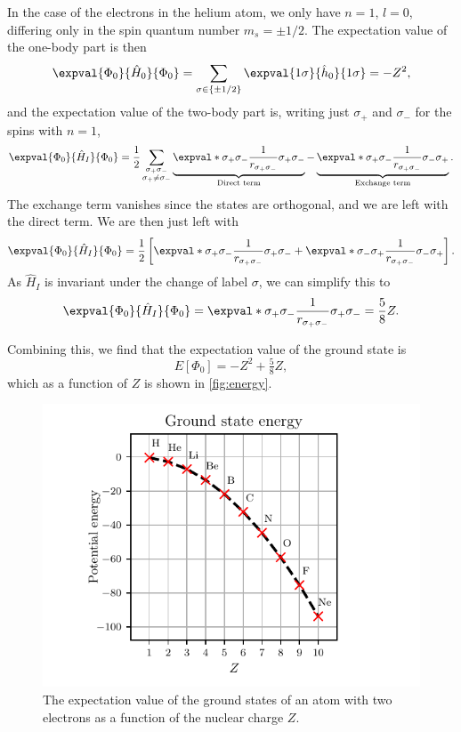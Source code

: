 In the case of the electrons in the helium atom, we only have $n = 1$, $l = 0$, differing only in the spin quantum number $m_s = \pm 1/2$.
The expectation value of the one-body part is then
\begin{equation*}
    \expval{\Phi_0}{\hat{H}_0}{\Phi_0} = \sum_{\sigma \in \{\pm 1/2\}} \expval{1\sigma}{\hat{h}_0}{1\sigma} = -Z^2,
\end{equation*}
and the expectation value of the two-body part is, writing just $\sigma_{+}$ and $\sigma_{-}$ for the spins with $n = 1$,
\begin{equation*}
    \expval{\Phi_0}{\hat{H}_I}{\Phi_0}
    = \frac{1}{2} \sum_{\substack{\sigma_{+}\sigma_{-}\\ \sigma_{+} \neq \sigma_{-}}}
    \underbrace{\expval*{\sigma_{+} \sigma_{-}}{\frac{1}{r_{\sigma_{+}\sigma_{-}}}}{\sigma_{+} \sigma_{-}}}_{\textnormal{Direct term}}
    - \underbrace{\expval*{\sigma_{+} \sigma_{-}}{\frac{1}{r_{\sigma_{+}\sigma_{-}}}}{\sigma_{-}\sigma_{+}}}_{\textnormal{Exchange term}}.
\end{equation*}
The exchange term vanishes since the states are orthogonal, and we are left with the direct term.
We are then just left with
\begin{equation*}
    \expval{\Phi_0}{\hat{H}_I}{\Phi_0} = \frac{1}{2}\left[ \expval*{\sigma_{+} \sigma_{-}}{\frac{1}{r_{\sigma_{+} \sigma_{-}}}}{\sigma_{+} \sigma_{-}} + \expval*{\sigma_{-} \sigma_{+}}{\frac{1}{r_{\sigma_{+} \sigma_{-}}}}{\sigma_{-} \sigma_{+}}\right].
\end{equation*}
As $\hat{H}_I$ is invariant under the change of label $\sigma$, we can simplify this to
\begin{equation*}
    \expval{\Phi_0}{\hat{H}_I}{\Phi_0} = \expval*{\sigma_{+} \sigma_{-}}{\frac{1}{r_{\sigma_{+} \sigma_{-}}}}{\sigma_{+} \sigma_{-}} = \frac{5}{8} Z.
\end{equation*}

Combining this, we find that the expectation value of the ground state is
\begin{equation}
    E[\Phi_0] = -Z^2 + \tfrac{5}{8}Z,
\end{equation}
which as a function of $Z$ is shown in \autoref{fig:energy}.

\begin{figure}[ht]
    \centering
    \includegraphics{figs/energy_plot.pdf}
    \caption{The expectation value of the ground states of an atom with two electrons as a function of the nuclear charge $Z$.\label{fig:energy}}
\end{figure}
